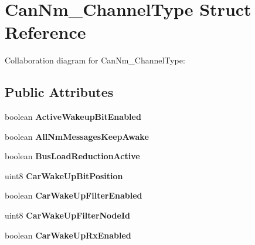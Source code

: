 \hypertarget{structCanNm__ChannelType}{}\section{Can\+Nm\+\_\+\+Channel\+Type Struct Reference}
\label{structCanNm__ChannelType}


Collaboration diagram for Can\+Nm\+\_\+\+Channel\+Type\+:
\subsection*{Public Attributes}
\begin{DoxyCompactItemize}
\item 
boolean {\bfseries Active\+Wakeup\+Bit\+Enabled}\hypertarget{structCanNm__ChannelType_ab60cd06bb19f55160d3e84307b9c27b8}{}\label{structCanNm__ChannelType_ab60cd06bb19f55160d3e84307b9c27b8}

\item 
boolean {\bfseries All\+Nm\+Messages\+Keep\+Awake}\hypertarget{structCanNm__ChannelType_ab2923c41df73aab17cfd472a38583b53}{}\label{structCanNm__ChannelType_ab2923c41df73aab17cfd472a38583b53}

\item 
boolean {\bfseries Bus\+Load\+Reduction\+Active}\hypertarget{structCanNm__ChannelType_afd001d2d8375273a46e35e6e6ff39979}{}\label{structCanNm__ChannelType_afd001d2d8375273a46e35e6e6ff39979}

\item 
uint8 {\bfseries Car\+Wake\+Up\+Bit\+Position}\hypertarget{structCanNm__ChannelType_a198a21753cb78c54f73891d5c5b9483d}{}\label{structCanNm__ChannelType_a198a21753cb78c54f73891d5c5b9483d}

\item 
boolean {\bfseries Car\+Wake\+Up\+Filter\+Enabled}\hypertarget{structCanNm__ChannelType_a3e2f93c5693644a4a3ab346d4ab89eaf}{}\label{structCanNm__ChannelType_a3e2f93c5693644a4a3ab346d4ab89eaf}

\item 
uint8 {\bfseries Car\+Wake\+Up\+Filter\+Node\+Id}\hypertarget{structCanNm__ChannelType_a84254bcc846aac2f0860123b5e45f13d}{}\label{structCanNm__ChannelType_a84254bcc846aac2f0860123b5e45f13d}

\item 
boolean {\bfseries Car\+Wake\+Up\+Rx\+Enabled}\hypertarget{structCanNm__ChannelType_a3648d4b0bfacf62b5c319e3cbfc028e4}{}\label{structCanNm__ChannelType_a3648d4b0bfacf62b5c319e3cbfc028e4}


\end{DoxyCompactItemize}
